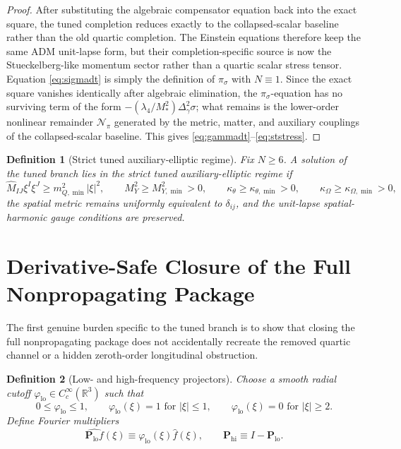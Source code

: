 \documentclass[11pt]{article}
\newtheorem{definition}{Definition}
\begin{document}
\begin{proof}
After substituting the algebraic compensator equation back into the exact square, the tuned completion reduces exactly to the collapsed-scalar baseline rather than the old quartic completion. The Einstein equations therefore keep the same ADM unit-lapse form, but their completion-specific source is now the Stueckelberg-like momentum sector rather than a quartic scalar stress tensor. Equation \eqref{eq:sigmadt} is simply the definition of \(\pi_\sigma\) with \(N\equiv 1\). Since the exact square vanishes identically after algebraic elimination, the \(\pi_\sigma\)-equation has no surviving term of the form \(-(\lambda_4/M_*^2)\Delta_\gamma^2\sigma\); what remains is the lower-order nonlinear remainder \(\mathcal N_\pi\) generated by the metric, matter, and auxiliary couplings of the collapsed-scalar baseline. This gives \eqref{eq:gammadt}--\eqref{eq:ststress}.
\end{proof}

\begin{definition}[Strict tuned auxiliary-elliptic regime]
\label{def:strict}
Fix \(N\ge 6\). A solution of the tuned branch lies in the \emph{strict tuned auxiliary-elliptic regime} if
\begin{equation}
\widehat M_{IJ}\xi^I\xi^J\ge m_{Q,\min}^2|\xi|^2,
\qquad
M_Y^2\ge M_{Y,\min}^2>0,
\qquad
\kappa_\theta\ge \kappa_{\theta,\min}>0,
\qquad
\kappa_\Omega\ge \kappa_{\Omega,\min}>0,
\label{eq:strict}
\end{equation}
the spatial metric remains uniformly equivalent to \(\delta_{ij}\), and the unit-lapse spatial-harmonic gauge conditions are preserved.
\end{definition}

\section{Derivative-Safe Closure of the Full Nonpropagating Package}

The first genuine burden specific to the tuned branch is to show that closing the full nonpropagating package does not accidentally recreate the removed quartic channel or a hidden zeroth-order longitudinal obstruction.

\begin{definition}[Low- and high-frequency projectors]
\label{def:projectors}
Choose a smooth radial cutoff \(\varphi_{\mathrm{lo}}\in C_c^\infty(\mathbb R^3)\) such that
\[
0\le \varphi_{\mathrm{lo}}\le 1,
\qquad
\varphi_{\mathrm{lo}}(\xi)=1 \text{ for } |\xi|\le 1,
\qquad
\varphi_{\mathrm{lo}}(\xi)=0 \text{ for } |\xi|\ge 2.
\]
Define Fourier multipliers
\begin{equation}
\widehat{\mathbf P_{\mathrm{lo}}f}(\xi)
\equiv
\varphi_{\mathrm{lo}}(\xi)\widehat f(\xi),
\qquad
\mathbf P_{\mathrm{hi}}\equiv I-\mathbf P_{\mathrm{lo}}.
\label{eq:projectors}
\end{equation}
\end{definition}
\end{document}
